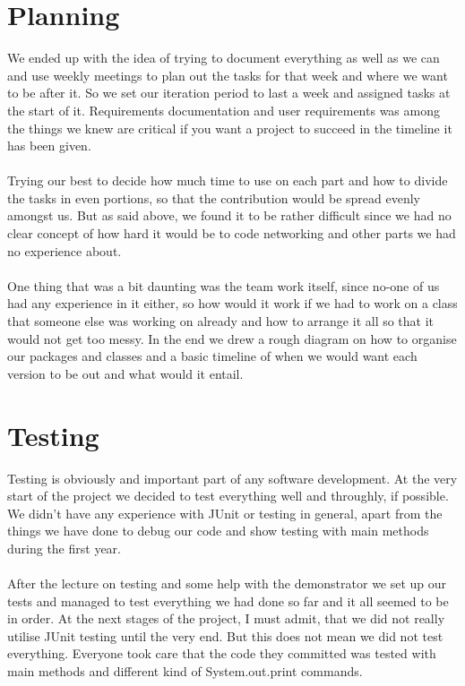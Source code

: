 \section{Planning}
\label{sec: planning}
We ended up with the idea of trying to document everything as well as we can and use weekly meetings to plan out the tasks for that week and where we want to be after it. So we set our iteration period to last a week and assigned tasks at the start of it. Requirements documentation and user requirements was among the things we knew are critical if you want a project to succeed in the timeline it has been given.\\\\
Trying our best to decide how much time to use on each part and how to divide the tasks in even portions, so that the contribution would be spread evenly amongst us. But as said above, we found it to be rather difficult since we had no clear concept of how hard it would be to code networking and other parts we had no experience about.\\\\
One thing that was a bit daunting was the team work itself, since no-one of us had any experience in it either, so how would it work if we had to work on a class that someone else was working on already and how to arrange it all so that it would not get too messy.
In the end we drew a rough diagram on how to organise our packages and classes and a basic timeline of when we would want each version to be out and what would it entail.

\section{Testing}
\label{sec: se_testing}
Testing is obviously and important part of any software development. At the very start of the project we decided to test everything well and throughly, if possible. We didn't have any experience with JUnit or testing in general, apart from the things we have done to debug our code and show testing with main methods during the first year.\\\\
After the lecture on testing and some help with the demonstrator we set up our tests and managed to test everything we had done so far and it all seemed to be in order. At the next stages of the project, I must admit, that we did not really utilise JUnit testing until the very end. But this does not mean we did not test everything. Everyone took care that the code they committed was tested with main methods and different kind of System.out.print commands.
